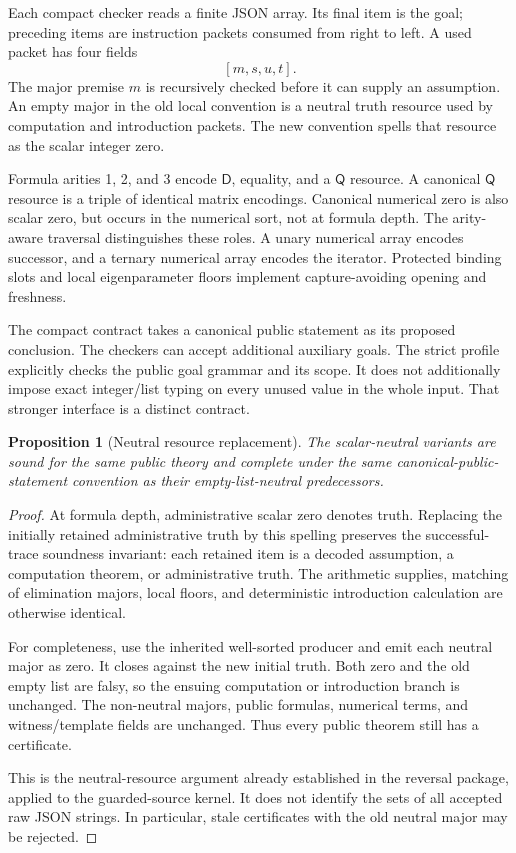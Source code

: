 \documentclass[11pt,letterpaper]{article}
\newtheorem{proposition}[theorem]{Proposition}
\theoremstyle{definition}
\theoremstyle{remark}
\newcommand{\D}{\mathsf D}
\newcommand{\Q}{\mathsf Q}
\begin{document}
Each compact checker reads a finite JSON array. Its final item is the
goal; preceding items are instruction packets consumed from right to
left. A used packet has four fields
\[
                [m,s,u,t].
\]
The major premise $m$ is recursively checked before it can supply an
assumption. An empty major in the old local convention is a neutral
truth resource used by computation and introduction packets. The new
convention spells that resource as the scalar integer zero.

Formula arities 1, 2, and 3 encode $\D$, equality, and a $\Q$ resource.
A canonical $\Q$ resource is a triple of identical matrix encodings.
Canonical numerical zero is also scalar zero, but occurs in the numerical
sort, not at formula depth. The arity-aware traversal distinguishes these
roles. A unary numerical array encodes successor, and a ternary numerical
array encodes the iterator. Protected binding slots and local eigenparameter
floors implement capture-avoiding opening and freshness.

The compact contract takes a canonical public statement as its proposed
conclusion. The checkers can accept additional auxiliary goals. The strict
profile explicitly checks the public goal grammar and its scope. It does
not additionally impose exact integer/list typing on every unused value
in the whole input. That stronger interface is a distinct contract.

\begin{proposition}[Neutral resource replacement]
The scalar-neutral variants are sound for the same public theory and
complete under the same canonical-public-statement convention as their
empty-list-neutral predecessors.
\end{proposition}
\begin{proof}
At formula depth, administrative scalar zero denotes truth. Replacing
the initially retained administrative truth by this spelling preserves
the successful-trace soundness invariant: each retained item is a decoded
assumption, a computation theorem, or administrative truth. The arithmetic
supplies, matching of elimination majors, local floors, and deterministic
introduction calculation are otherwise identical.

For completeness, use the inherited well-sorted producer and emit each
neutral major as zero. It closes against the new initial truth. Both
zero and the old empty list are falsy, so the ensuing computation or
introduction branch is unchanged. The non-neutral majors, public formulas,
numerical terms, and witness/template fields are unchanged. Thus every
public theorem still has a certificate.

This is the neutral-resource argument already established in the reversal
package, applied to the guarded-source kernel. It does not identify the
sets of all accepted raw JSON strings. In particular, stale certificates
with the old neutral major may be rejected.
\end{proof}
\end{document}
